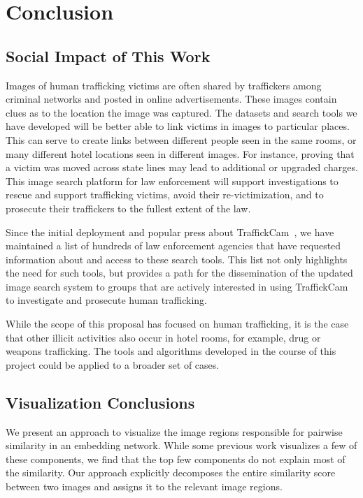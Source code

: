 
\chapter{Conclusion}
\label{ch:9}

\section{Social Impact of This Work}
Images of human trafficking victims are often shared by traffickers among criminal networks and posted in online advertisements. These images contain clues as to the location the image was captured. The datasets and search tools we have developed will be better able to link victims in images to particular places. This can serve to create links between different people seen in the same rooms, or many different hotel locations seen in different images. For instance, proving that a victim was moved across state lines may lead to additional or upgraded charges. This image search platform for law enforcement will support investigations to rescue and support trafficking victims, avoid their re-victimization, and to prosecute their traffickers to the fullest extent of the law. 

Since the initial deployment and popular press about TraffickCam~\cite{cnn,techcrunch,washingtonpost}, we have maintained a list of hundreds of law enforcement agencies that have requested information about and access to these search tools. This list not only highlights the need for such tools, but provides a path for the dissemination of the updated image search system to groups that are actively interested in using TraffickCam to investigate and prosecute human trafficking.

While the scope of this proposal has focused on human trafficking, it is the case that other illicit activities also occur in hotel rooms, for example, drug or weapons trafficking. The tools and algorithms developed in the course of this project could be applied to a broader set of cases.

\section{Visualization Conclusions}
We present an approach to visualize the image regions responsible for pairwise similarity in an embedding network.  While some previous work visualizes a few of these components, we find that the top few components do not explain most of the similarity.  Our approach explicitly decomposes the entire similarity score between two images and assigns it to the relevant image regions.

